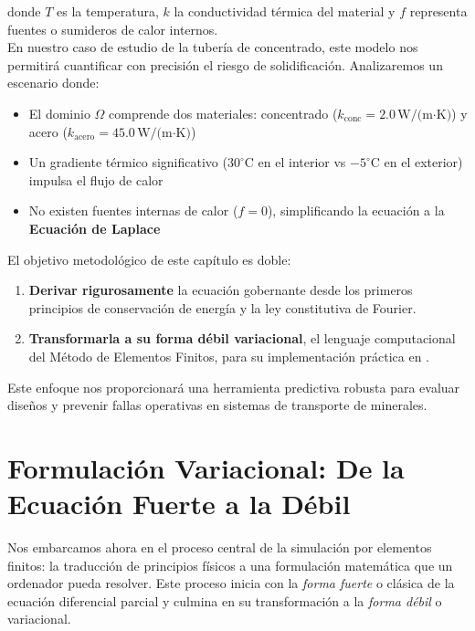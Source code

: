 donde \(T\) es la temperatura, \(k\) la conductividad térmica del material y \(f\) representa fuentes o sumideros de calor internos.\\

En nuestro caso de estudio de la tubería de concentrado, este modelo nos permitirá cuantificar con precisión el riesgo de solidificación. Analizaremos un escenario donde:
\begin{itemize}
    \item El dominio \(\Omega\) comprende dos materiales: concentrado (\(k_{\text{conc}} = 2.0\,\text{W/(m·K)}\)) y acero (\(k_{\text{acero}} = 45.0\,\text{W/(m·K)}\))
    \item Un gradiente térmico significativo (\(30^\circ\text{C}\) en el interior vs \(-5^\circ\text{C}\) en el exterior) impulsa el flujo de calor
    \item No existen fuentes internas de calor (\(f = 0\)), simplificando la ecuación a la \textbf{Ecuación de Laplace}
\end{itemize}

El objetivo metodológico de este capítulo es doble:
\begin{enumerate}
    \item \textbf{Derivar rigurosamente} la ecuación gobernante desde los primeros principios de conservación de energía y la ley constitutiva de Fourier.
    \item \textbf{Transformarla a su forma débil variacional}, el lenguaje computacional del Método de Elementos Finitos, para su implementación práctica en \fenics.
\end{enumerate}

Este enfoque nos proporcionará una herramienta predictiva robusta para evaluar diseños y prevenir fallas operativas en sistemas de transporte de minerales.

\section{Formulación Variacional: De la Ecuación Fuerte a la Débil}
\label{sec:poisson-derivation}

Nos embarcamos ahora en el proceso central de la simulación por elementos finitos: la traducción de principios físicos a una formulación matemática que un ordenador pueda resolver. Este proceso inicia con la \textit{forma fuerte} o clásica de la ecuación diferencial parcial y culmina en su transformación a la \textit{forma débil} o variacional.

